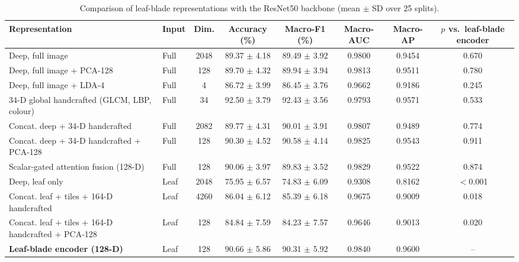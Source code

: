 \begin{table}[tbp]
\centering
\footnotesize
\caption{Comparison of leaf-blade representations with the ResNet50 backbone (mean $\pm$ SD over 25 splits).}
\label{tab:compare_resnet50}
\begin{adjustbox}{max width=\textwidth}
\begin{tabular}{llcccccc}
\toprule
Representation & Input & Dim. & Accuracy (\%) & Macro-F1 (\%) & Macro-AUC & Macro-AP & $p$ vs.\ leaf-blade encoder \\
\midrule
Deep, full image & Full & 2048 & 89.37 $\pm$ 4.18 & 89.49 $\pm$ 3.92 & 0.9800 & 0.9454 & 0.670 \\
Deep, full image + PCA-128 & Full & 128 & 89.70 $\pm$ 4.32 & 89.94 $\pm$ 3.94 & 0.9813 & 0.9511 & 0.780 \\
Deep, full image + LDA-4 & Full & 4 & 86.72 $\pm$ 3.99 & 86.45 $\pm$ 3.76 & 0.9662 & 0.9186 & 0.245 \\
34-D global handcrafted (GLCM, LBP, colour) & Full & 34 & 92.50 $\pm$ 3.79 & 92.43 $\pm$ 3.56 & 0.9793 & 0.9571 & 0.533 \\
Concat. deep + 34-D handcrafted & Full & 2082 & 89.77 $\pm$ 4.31 & 90.01 $\pm$ 3.91 & 0.9807 & 0.9489 & 0.774 \\
Concat. deep + 34-D handcrafted + PCA-128 & Full & 128 & 90.30 $\pm$ 4.52 & 90.58 $\pm$ 4.14 & 0.9825 & 0.9543 & 0.911 \\
Scalar-gated attention fusion (128-D) & Full & 128 & 90.06 $\pm$ 3.97 & 89.83 $\pm$ 3.52 & 0.9829 & 0.9522 & 0.874 \\
\midrule
Deep, leaf only & Leaf & 2048 & 75.95 $\pm$ 6.57 & 74.83 $\pm$ 6.09 & 0.9308 & 0.8162 & $<$0.001 \\
Concat. leaf + tiles + 164-D handcrafted & Leaf & 4260 & 86.04 $\pm$ 6.12 & 85.39 $\pm$ 6.18 & 0.9675 & 0.9009 & 0.018 \\
Concat. leaf + tiles + 164-D handcrafted + PCA-128 & Leaf & 128 & 84.84 $\pm$ 7.59 & 84.23 $\pm$ 7.57 & 0.9646 & 0.9013 & 0.020 \\
\textbf{Leaf-blade encoder (128-D)} & Leaf & 128 & 90.66 $\pm$ 5.86 & 90.31 $\pm$ 5.92 & 0.9840 & 0.9600 & -- \\
\bottomrule
\end{tabular}
\end{adjustbox}
\end{table}
